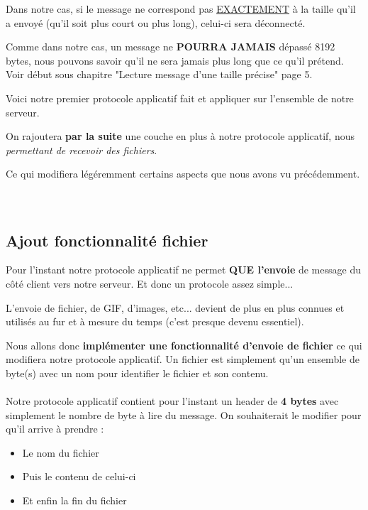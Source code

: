     Dans notre cas, si le message ne correspond pas \underline{EXACTEMENT} à la taille qu'il a envoyé (qu'il soit plus court ou plus long), celui-ci sera déconnecté.

    Comme dans notre cas, un message ne \textbf{POURRA JAMAIS} dépassé 8192 bytes, nous pouvons savoir qu'il ne sera jamais plus long que ce qu'il prétend. Voir début sous chapitre "Lecture message d'une taille précise" page 5.
    

    Voici notre premier protocole applicatif fait et appliquer sur l'ensemble de notre serveur.

    On rajoutera \textbf{par la suite} une couche en plus à notre protocole applicatif, nous \textit{permettant de recevoir des fichiers}. \par 
    Ce qui modifiera légéremment certains aspects que nous avons vu précédemment. \\ \\ \\



\subsection{Ajout fonctionnalité fichier}

Pour l'instant notre protocole applicatif ne permet \textbf{QUE l'envoie} de message du côté client vers notre serveur. Et donc un protocole assez simple... \par
L'envoie de fichier, de GIF, d'images, etc... devient de plus en plus connues et utilisés au fur et à mesure du temps (c'est presque devenu essentiel). \\ \par
Nous allons donc \textbf{implémenter une fonctionnalité d'envoie de fichier} ce qui modifiera notre protocole applicatif. Un fichier est simplement qu'un ensemble de byte(s) avec un nom pour identifier le fichier et son contenu. \\ \\

Notre protocole applicatif contient pour l'instant un header de \textbf{4 bytes} avec simplement le nombre de byte à lire du message. On souhaiterait le modifier pour qu'il arrive à prendre :
\begin{itemize}
    \item Le nom du fichier
    \item Puis le contenu de celui-ci
    \item Et enfin la fin du fichier
\end{itemize} \hfill \\ \par


